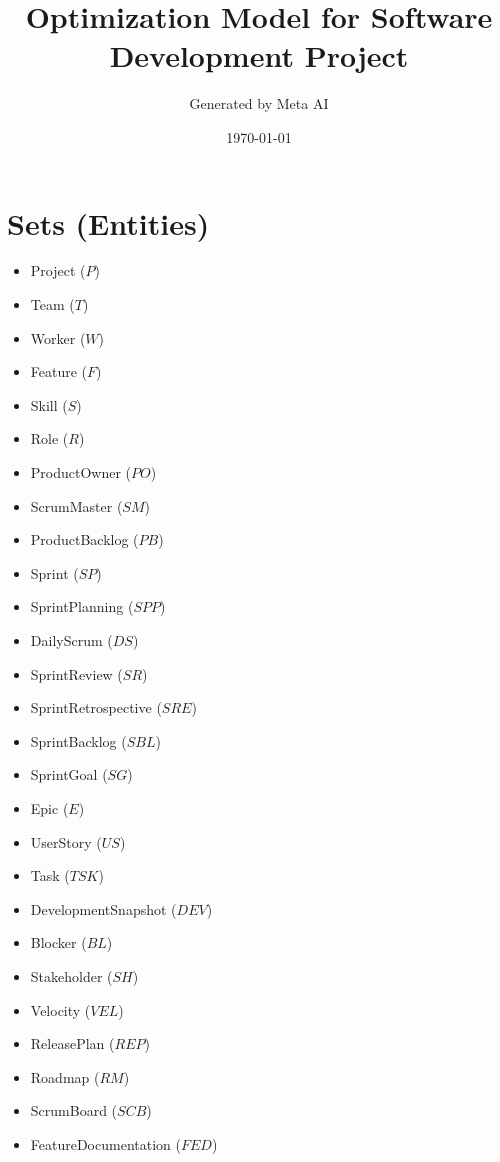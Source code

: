 \documentclass{article}
\title{Optimization Model for Software Development Project}
\author{Generated by Meta AI}
\date{\today}
\begin{document}
\maketitle
\tableofcontents

\section{Sets (Entities)}
\begin{itemize}
    \item Project ($P$)
    \item Team ($T$)
    \item Worker ($W$)
    \item Feature ($F$)
    \item Skill ($S$)
    \item Role ($R$)
    \item ProductOwner ($PO$)
    \item ScrumMaster ($SM$)
    \item ProductBacklog ($PB$)
    \item Sprint ($SP$)
    \item SprintPlanning ($SPP$)
    \item DailyScrum ($DS$)
    \item SprintReview ($SR$)
    \item SprintRetrospective ($SRE$)
    \item SprintBacklog ($SBL$)
    \item SprintGoal ($SG$)
    \item Epic ($E$)
    \item UserStory ($US$)
    \item Task ($TSK$)
    \item DevelopmentSnapshot ($DEV$)
    \item Blocker ($BL$)
    \item Stakeholder ($SH$)
    \item Velocity ($VEL$)
    \item ReleasePlan ($REP$)
    \item Roadmap ($RM$)
    \item ScrumBoard ($SCB$)
    \item FeatureDocumentation ($FED$)
\end{itemize}
\end{document}
